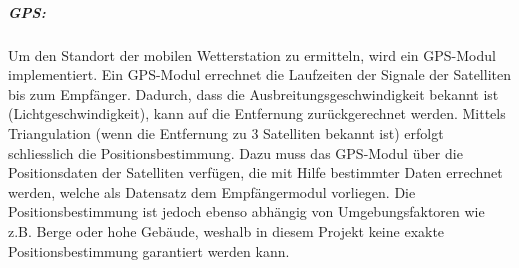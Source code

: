 \subparagraph{GPS:}
Um den Standort der mobilen Wetterstation zu ermitteln, wird ein GPS-Modul implementiert. Ein GPS-Modul errechnet die Laufzeiten der Signale der Satelliten bis zum Empfänger. Dadurch, dass die Ausbreitungsgeschwindigkeit bekannt ist (Lichtgeschwindigkeit), kann auf die Entfernung zurückgerechnet werden. Mittels Triangulation (wenn die Entfernung zu 3 Satelliten bekannt ist) erfolgt schliesslich die Positionsbestimmung. Dazu muss das GPS-Modul über die Positionsdaten der Satelliten verfügen, die mit Hilfe bestimmter Daten errechnet werden, welche als Datensatz dem Empfängermodul vorliegen. Die Positionsbestimmung ist jedoch ebenso abhängig von Umgebungsfaktoren wie z.B. Berge oder hohe Gebäude, weshalb in diesem Projekt keine exakte Positionsbestimmung garantiert werden kann.\\